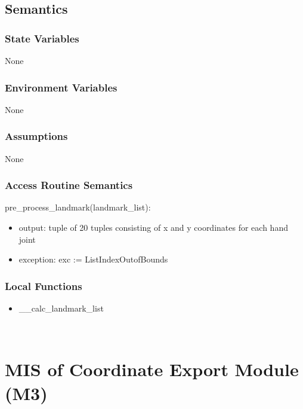 \documentclass[12pt, titlepage]{article}
\begin{document}
\subsection{Semantics}

\subsubsection{State Variables}

None\\

\subsubsection{Environment Variables}

None\\

\subsubsection{Assumptions}

None

\subsubsection{Access Routine Semantics}

\noindent pre_process_landmark(landmark_list):
\begin{itemize}
\item output: tuple of 20 tuples consisting of x and y coordinates for each hand joint\\
\item exception: exc := ListIndexOutofBounds\\
\end{itemize}

\subsubsection{Local Functions}
\begin{itemize}
\item __calc_landmark_list\\
\end{itemize}

\newpage
~\newpage

\section{MIS of Coordinate Export Module (M3)} \label{M3}
\end{document}
